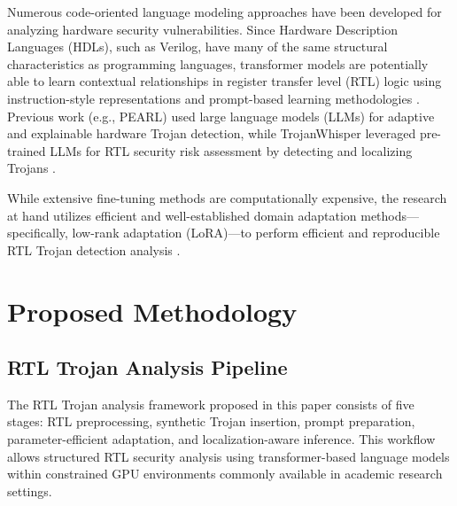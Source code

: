 \documentclass[conference]{IEEEtran}
\begin{document}
Numerous code-oriented language modeling approaches have been developed for analyzing hardware security vulnerabilities. Since Hardware Description Languages (HDLs), such as Verilog, have many of the same structural characteristics as programming languages, transformer models are potentially able to learn contextual relationships in register transfer level (RTL) logic using instruction-style representations and prompt-based learning methodologies \cite{vaswani2017attention}. Previous work (e.g., PEARL) used large language models (LLMs) for adaptive and explainable hardware Trojan detection, while TrojanWhisper leveraged pre-trained LLMs for RTL security risk assessment by detecting and localizing Trojans \cite{kundu2025pearl,trojanwhisper}.

While extensive fine-tuning methods are computationally expensive, the research at hand utilizes efficient and well-established domain adaptation methods---specifically, low-rank adaptation (LoRA)---to perform efficient and reproducible RTL Trojan detection analysis \cite{lora}.



\section{Proposed Methodology}
\label{sec:methodology}




\subsection{RTL Trojan Analysis Pipeline}
\label{subsec:rtl_pipeline}

The RTL Trojan analysis framework proposed in this paper consists of five stages: RTL preprocessing, synthetic Trojan insertion, prompt preparation, parameter-efficient adaptation, and localization-aware inference. This workflow allows structured RTL security analysis using transformer-based language models within constrained GPU environments commonly available in academic research settings.
\end{document}
